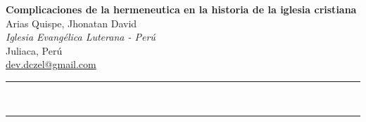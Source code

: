 \documentclass[a4paper,11pt]{article}
\renewenvironment{abstract}
 {\par\noindent\textbf{\abstractname}\ \ignorespaces \\}
 {\par\noindent\medskip}
\begin{document}
\pagestyle{fancy}
\thispagestyle{empty}
\fancyhead[L]{}
\renewcommand*{\thefootnote}{\fnsymbol{footnote}}
\begin{center}
\Large{\textbf{Complicaciones de la hermeneutica en la historia de la iglesia cristiana}}
\vspace{0.4cm}
\normalsize
\\ Arias Quispe, Jhonatan David \\
\vspace{0.1cm}
\textit{Iglesia Evangélica Luterana - Perú}\\
\small{Juliaca, Perú} \\
\href{mailto:dev.dczel@gmail.com}{dev.dczel@gmail.com}
\medskip
\normalsize
\end{center}
{\color{gray}\hrule}
\vspace{0.4cm}
\begin{abstract}

\end{abstract}
{\color{gray}\hrule}
\medskip






% 


\end{document}
